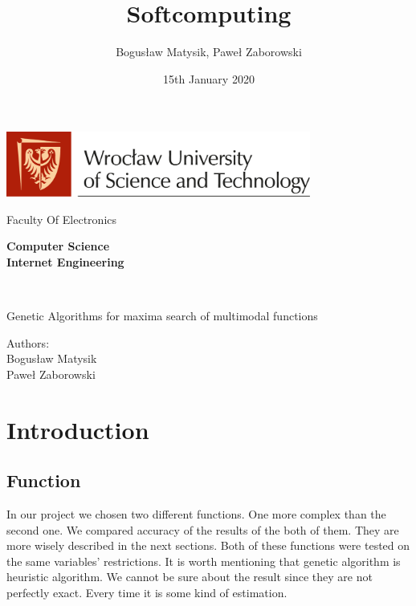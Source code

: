 \documentclass[a4paper, 12pt]{article}
\title{Softcomputing}
\author{Bogusław Matysik, Paweł Zaborowski}
\date{15th January 2020}
\begin{document}
\begin{titlepage}
    \makeatletter
    \vspace{1cm}
    \begin{center}
        \includegraphics[width=0.75\textwidth]{PWr-logo_ang.png} \par
        \vspace{0.2cm}
        \Large Faculty Of Electronics \par
        \vspace{1.25cm}
        {    
            \bfseries
            Computer Science \\
            \vspace{0.25cm}
    	    \normalsize Internet Engineering \par
    	    \vspace{2cm}
    	    \Huge \@title \\
    	}
    	\vspace{0.5cm}
        \large Genetic Algorithms for maxima search of multimodal functions
    \end{center}
    \null
    \vfill
    \begin{flushright}
        Authors: \\
        Bogusław Matysik \\
        Paweł Zaborowski \\
    \end{flushright}
    \vspace{0.5cm}
\end{titlepage}

\newpage
\tableofcontents

\newpage
\section{Introduction}

\subsection{Function}

In our project we chosen two different functions. One more complex than the second one. We compared accuracy of the results of the both of them. They are more wisely described in the next sections. Both of these functions were tested on the same variables' restrictions.
It is worth mentioning that genetic algorithm is heuristic algorithm. We cannot be sure about the result since they are not perfectly exact. Every time it is some kind of estimation.
	
\end{document}
